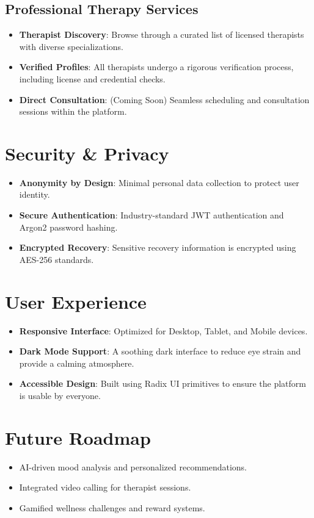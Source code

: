 \documentclass[11pt,a4paper]{article}
\begin{document}
\subsection{Professional Therapy Services}
\begin{itemize}
    \item \textbf{Therapist Discovery}: Browse through a curated list of licensed therapists with diverse specializations.
    \item \textbf{Verified Profiles}: All therapists undergo a rigorous verification process, including license and credential checks.
    \item \textbf{Direct Consultation}: (Coming Soon) Seamless scheduling and consultation sessions within the platform.
\end{itemize}

\section{Security \& Privacy}
\begin{itemize}
    \item \textbf{Anonymity by Design}: Minimal personal data collection to protect user identity.
    \item \textbf{Secure Authentication}: Industry-standard JWT authentication and Argon2 password hashing.
    \item \textbf{Encrypted Recovery}: Sensitive recovery information is encrypted using AES-256 standards.
\end{itemize}

\section{User Experience}
\begin{itemize}
    \item \textbf{Responsive Interface}: Optimized for Desktop, Tablet, and Mobile devices.
    \item \textbf{Dark Mode Support}: A soothing dark interface to reduce eye strain and provide a calming atmosphere.
    \item \textbf{Accessible Design}: Built using Radix UI primitives to ensure the platform is usable by everyone.
\end{itemize}

\section{Future Roadmap}
\begin{itemize}
    \item AI-driven mood analysis and personalized recommendations.
    \item Integrated video calling for therapist sessions.
    \item Gamified wellness challenges and reward systems.
\end{itemize}
\end{document}
